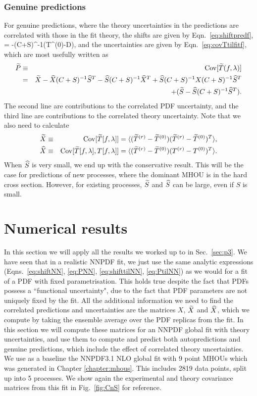 \subsubsection{Genuine predictions}
For genuine predictions, where the theory uncertainties in the predictions are correlated with those in the fit theory, the shifts are 
given by  Eqn.~\ref{eq:shiftpredf}, 
\be
\label{eq:shifttilNN}
\delta \Ttil[f]  = -\Shat(C+S)^{-1}(T^{(0)}-D),
\ee
and the uncertainties are given by Eqn.~\ref{eq:covTtilfitf}, which are most usefully written as
\begin{eqnarray}
\widetilde{P}&\equiv&{{\rm Cov}}[\widetilde{T}(f,\lambda)]\nonumber\\
&=&\widetilde{X}  - \widehat{X}(C+S)^{-1}\widehat{S}^T - \widehat{S}(C+S)^{-1}\widehat{X}^T+\widehat{S}(C+S)^{-1}X(C+S)^{-1}\widehat{S}^T
 \nonumber\\ &&\qquad + (\widetilde{S}  - \widehat{S}(C+S)^{-1}\widehat{S}^T) \label{eq:PtilNN}.
\end{eqnarray}
The second line are contributions to the correlated PDF uncertainty, and the third line are contributions to the correlated theory uncertainty. Note that we also need to calculate
\begin{eqnarray} 
\widetilde{X}&\equiv&{\rm Cov}[\widetilde{T}[f,\lambda]] = \langle (\widetilde{T}^{(r)} -\widetilde{T}^{(0)}) (\widetilde{T}^{(r)} - \widetilde{T}^{(0)})^T\rangle\label{eq:XtildefNN},\\
\widehat{X}&\equiv&{\rm Cov}[\widetilde{T}[f,\lambda],T[f,\lambda]] = \langle (\widetilde{T}^{(r)} -\widetilde{T}^{(0)}) (T^{(r)} - T^{(0)})^T\rangle\label{eq:XhatdefNN}.
\end{eqnarray}
When $\widehat{S}$ is very small, we end up with the conservative result. This will be the case for predictions of new processes, where the dominant MHOU is in the hard cross section. However, for existing processes, $\widetilde{S}$ and $\widehat{S}$ can be large, even if $S$ is small.

\section{Numerical results}
\label{sec:p4}
In this section we will apply all the results we worked up to in Sec.~\ref{sec:p3}. We have seen that in a realistic NNPDF fit, we just use the same analytic expressions (Eqns.~\ref{eq:shiftNN}, \ref{eq:PNN}, \ref{eq:shifttilNN}, \ref{eq:PtilNN}) as we would for a fit of a PDF with fixed parametrisation. This holds true despite the fact that PDFs possess a ``functional uncertainty", due to the fact that PDF parameters are not uniquely fixed by the fit. All the additional information we need to find the correlated predictions and uncertainties are the matrices $X$, $\widetilde{X}$ and $\widehat{X}$, which we compute by taking the ensemble average over the PDF replicas from the fit. In this section we will compute these matrices for an NNPDF global fit with theory uncertainties, and use them to compute and predict both autopredictions and genuine predictions, which include the effect of correlated theory uncertainties.
We use as a baseline the NNPDF3.1 NLO global fit with 9 point MHOUs which was generated in Chapter \ref{chapter:mhous}. This includes 2819 data points, split up into 5 processes. We show again the experimental and theory covariance matrices from this fit in Fig.~\ref{fig:CnS} for reference.

